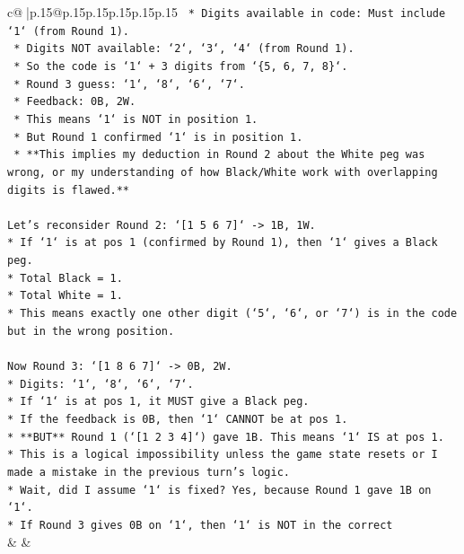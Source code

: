 \documentclass{article}
\begin{document}
{\begin{supertabular}{c@{$\;$}|p{.15\linewidth}@{}p{.15\linewidth}p{.15\linewidth}p{.15\linewidth}p{.15\linewidth}p{.15\linewidth}}
{{{\texttt{            *   Digits available in code: Must include `1` (from Round 1).} \\
\texttt{            *   Digits NOT available: `2`, `3`, `4` (from Round 1).} \\
\texttt{            *   So the code is `1` + 3 digits from `\{5, 6, 7, 8\}`.} \\
\texttt{            *   Round 3 guess: `1`, `8`, `6`, `7`.} \\
\texttt{            *   Feedback: 0B, 2W.} \\
\texttt{            *   This means `1` is NOT in position 1.} \\
\texttt{            *   But Round 1 confirmed `1` is in position 1.} \\
\texttt{            *   **This implies my deduction in Round 2 about the White peg was wrong, or my understanding of how Black/White work with overlapping digits is flawed.**} \\
\\ 
\texttt{Let's reconsider Round 2: `{[}1 5 6 7{]}` {-}> 1B, 1W.} \\
\texttt{*   If `1` is at pos 1 (confirmed by Round 1), then `1` gives a Black peg.} \\
\texttt{*   Total Black = 1.} \\
\texttt{*   Total White = 1.} \\
\texttt{*   This means exactly one other digit (`5`, `6`, or `7`) is in the code but in the wrong position.} \\
\\ 
\texttt{Now Round 3: `{[}1 8 6 7{]}` {-}> 0B, 2W.} \\
\texttt{*   Digits: `1`, `8`, `6`, `7`.} \\
\texttt{*   If `1` is at pos 1, it MUST give a Black peg.} \\
\texttt{*   If the feedback is 0B, then `1` CANNOT be at pos 1.} \\
\texttt{*   **BUT** Round 1 (`{[}1 2 3 4{]}`) gave 1B. This means `1` IS at pos 1.} \\
\texttt{*   This is a logical impossibility unless the game state resets or I made a mistake in the previous turn's logic.} \\
\texttt{*   Wait, did I assume `1` is fixed? Yes, because Round 1 gave 1B on `1`.} \\
\texttt{*   If Round 3 gives 0B on `1`, then `1` is NOT in the correct} \\
            }
        }
    }
    & & \\ \\


\end{supertabular}}
\end{document}

